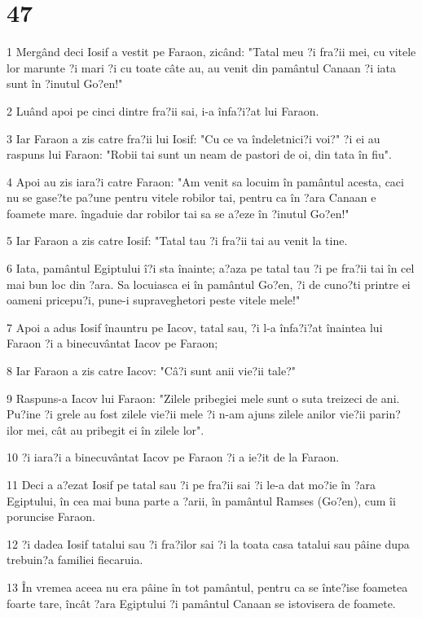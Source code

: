 \chapter{47}

\par 1 Mergând deci Iosif a vestit pe Faraon, zicând: "Tatal meu ?i fra?ii mei, cu vitele lor marunte ?i mari ?i cu toate câte au, au venit din pamântul Canaan ?i iata sunt în ?inutul Go?en!"
\par 2 Luând apoi pe cinci dintre fra?ii sai, i-a înfa?i?at lui Faraon.
\par 3 Iar Faraon a zis catre fra?ii lui Iosif: "Cu ce va îndeletnici?i voi?" ?i ei au raspuns lui Faraon: "Robii tai sunt un neam de pastori de oi, din tata în fiu".
\par 4 Apoi au zis iara?i catre Faraon: "Am venit sa locuim în pamântul acesta, caci nu se gase?te pa?une pentru vitele robilor tai, pentru ca în ?ara Canaan e foamete mare. îngaduie dar robilor tai sa se a?eze în ?inutul Go?en!"
\par 5 Iar Faraon a zis catre Iosif: "Tatal tau ?i fra?ii tai au venit la tine.
\par 6 Iata, pamântul Egiptului î?i sta înainte; a?aza pe tatal tau ?i pe fra?ii tai în cel mai bun loc din ?ara. Sa locuiasca ei în pamântul Go?en, ?i de cuno?ti printre ei oameni pricepu?i, pune-i supraveghetori peste vitele mele!"
\par 7 Apoi a adus Iosif înauntru pe Iacov, tatal sau, ?i l-a înfa?i?at înaintea lui Faraon ?i a binecuvântat Iacov pe Faraon;
\par 8 Iar Faraon a zis catre Iacov: "Câ?i sunt anii vie?ii tale?"
\par 9 Raspuns-a Iacov lui Faraon: "Zilele pribegiei mele sunt o suta treizeci de ani. Pu?ine ?i grele au fost zilele vie?ii mele ?i n-am ajuns zilele anilor vie?ii parin?ilor mei, cât au pribegit ei în zilele lor".
\par 10 ?i iara?i a binecuvântat Iacov pe Faraon ?i a ie?it de la Faraon.
\par 11 Deci a a?ezat Iosif pe tatal sau ?i pe fra?ii sai ?i le-a dat mo?ie în ?ara Egiptului, în cea mai buna parte a ?arii, în pamântul Ramses (Go?en), cum îi poruncise Faraon.
\par 12 ?i dadea Iosif tatalui sau ?i fra?ilor sai ?i la toata casa tatalui sau pâine dupa trebuin?a familiei fiecaruia.
\par 13 În vremea aceea nu era pâine în tot pamântul, pentru ca se înte?ise foametea foarte tare, încât ?ara Egiptului ?i pamântul Canaan se istovisera de foamete.
